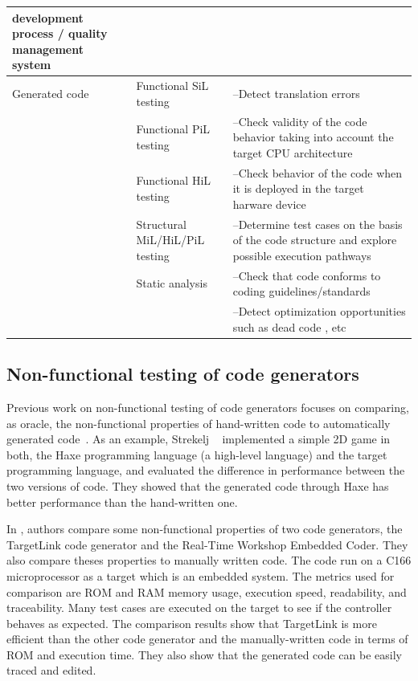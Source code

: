 \begin{table}[H]
{\begin{tabular}{| p{} | p{} |p{} |}
			development process / quality management system \\ \hline
			Generated code 
			& Functional SiL testing & --Detect translation errors \\
			\cline{2-3}
			& Functional PiL testing & --Check validity of the code behavior taking into account the target CPU architecture \\
			\cline{2-3}
			& Functional HiL testing & --Check behavior of the code when it is deployed in the target harware device \\
			\cline{2-3}
			& Structural MiL/HiL/PiL testing & --Determine test cases on the basis of the code structure and explore possible execution pathways \\
			\cline{2-3}
			& Static analysis & --Check that code conforms to coding guidelines/standards\\
			&& --Detect optimization opportunities such as dead code \deleted[remark={redondant}]{detection}, etc \\
			\hline
		\end{tabular}}
		\label{tab:targetlink}
	\end{table}
 


\subsection{Non-functional testing of code generators}
\label{sec:Non-functional testing of code generators}
Previous work on non-functional testing of code generators focuses on comparing, as oracle, the non-functional properties of hand-written code to automatically generated code~\cite{stepasyuk2015evaluating,richard2013efficient}. As an example, Strekelj \etal~\cite{vstrekelj2015performance} implemented a simple 2D game in both, the Haxe programming language (a high-level language) and the target programming language, and evaluated the difference in performance between the two versions of code. They showed that the generated code through Haxe has better performance than the hand-written one. 

In \cite{ajwad2007evaluation}, authors compare some non-functional properties of two code generators, the TargetLink code generator and the Real-Time Workshop Embedded Coder. They also compare theses properties to manually written code. The code run on a C166 microprocessor as a target which is an embedded system.
The metrics used for comparison are ROM and RAM memory usage, execution speed, readability, and traceability. Many test cases are executed on the target to see if the controller behaves as expected.
The comparison results show that TargetLink is more efficient than the other code generator and  the manually-written code in terms of ROM and execution time. They also show that the generated code can be easily traced and edited.


